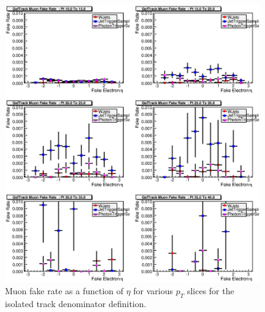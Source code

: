 \documentclass{cmspaper}
\begin{document}
\begin{figure}[htb]
\begin{center}
\includegraphics[width=0.98\textwidth]{plots/IsoTrackMuonFakeRatePtSlices.eps}
   \caption{Muon fake rate as a function of $\eta$ for various $p_T$ slices for the isolated track denominator definition. }
   \label{fig:muonFR_isotrack_ptslices}
\end{center}
\end{figure}
\end{document}
